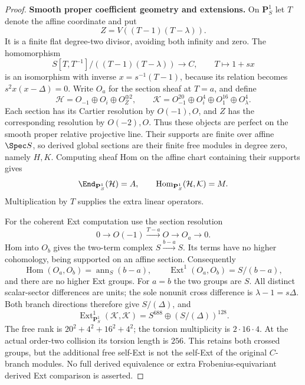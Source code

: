 \documentclass[11pt,a4paper]{article}
\newcommand{\mathscr}{\mathcal}
\theoremstyle{named}\newtheorem{finding}{Finding}[section]
\theoremstyle{definition}\newtheorem{definition}[finding]{Definition}
\theoremstyle{remark}\newtheorem{remark}[finding]{Remark}
\begin{document}
\begin{proof}
\par\smallskip\noindent\textbf{Smooth proper coefficient geometry and extensions.}\quad
On $\mathbf P^1_S$ let $T$ denote the affine coordinate and put
\[
 Z=V((T-1)(T-\lambda)).
\]
It is a finite flat degree-two divisor, avoiding both infinity
and zero. The homomorphism
\[
 S[T,T^{-1}]/((T-1)(T-\lambda))
       \longrightarrow C,\qquad T\longmapsto1+s x
\]
is an isomorphism with inverse $x=s^{-1}(T-1)$, because its
relation becomes $s^2x(x-\Delta)=0$.
Write $O_a$ for the section sheaf at $T=a$, and define
\[
 \mathscr H=O_{-1}\oplus O_i\oplus O_Z^{\oplus2},\qquad
 \mathscr K=O_{-1}^{20}\oplus O_i^4
       \oplus O_1^{16}\oplus O_\lambda^4.
\]
Each section has its Cartier resolution by $O(-1),O$,
and $Z$ has the corresponding resolution by $O(-2),O$.
Thus these objects are perfect on the smooth proper
relative projective line. Their supports are finite over
affine $\Spec S$, so derived global sections are their
finite free modules in degree zero, namely $H,K$.
Computing sheaf Hom on the affine chart containing their
supports gives
\[
 \End_{\mathbf P^1_S}(\mathscr H)=A,\qquad
 \operatorname{Hom}_{\mathbf P^1_S}(\mathscr H,\mathscr K)=M.
\]
Multiplication by $T$ supplies the extra linear operators.

For the coherent Ext computation use the section resolution
\[
 0\longrightarrow O(-1)\xrightarrow{T-a}O
       \longrightarrow O_a\longrightarrow0.
\]
Hom into $O_b$ gives the two-term complex
$S\xrightarrow{b-a}S$. Its terms have no higher cohomology,
being supported on an affine section. Consequently
\[
 \operatorname{Hom}(O_a,O_b)=\operatorname{ann}_S(b-a),
 \qquad
 \operatorname{Ext}^1(O_a,O_b)=S/(b-a),
\]
and there are no higher Ext groups. For $a=b$ the two
groups are $S$. All distinct scalar-sector differences
are units; the sole nonunit cross difference is
$\lambda-1=s\Delta$. Both branch directions therefore give
$S/(\Delta)$, and
\begin{equation}\label{eq:cayleyext}
 \operatorname{Ext}^1_{\mathbf P^1_S}(\mathscr K,\mathscr K)
      =S^{688}\oplus(S/(\Delta))^{128}.
\end{equation}
The free rank is $20^2+4^2+16^2+4^2$; the torsion multiplicity
is $2\cdot16\cdot4$. At the actual order-two collision its
torsion length is $256$. This retains both crossed groups,
but the additional free self-Ext is not the self-Ext of the
original $C$-branch modules. No full derived equivalence
or extra Frobenius-equivariant derived Ext comparison is
asserted.


\end{proof}
\end{document}
